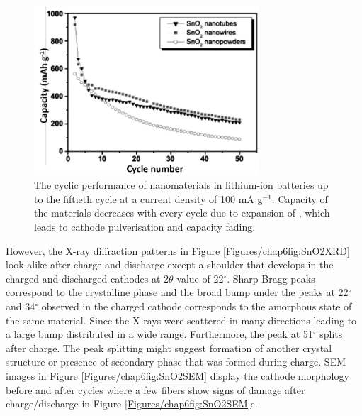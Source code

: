 \begin{figure}[th!]
\centering
\includegraphics[width=0.75\textwidth]{Figures/chap6fig/sno2pap.pdf}
\caption{The cyclic performance of  nanomaterials in lithium-ion batteries up to the fiftieth cycle at a current density of 100 mA g$^{-1}$. Capacity of the materials decreases with every cycle due to expansion of , which leads to cathode pulverisation and capacity fading.}
\label{Figures/chap6fig:sno2pap}
\end{figure}

However, the X-ray diffraction patterns in Figure \ref{Figures/chap6fig:SnO2XRD} look alike after charge and discharge except a shoulder that develops in the charged and discharged cathodes at 2$\theta$ value of 22$^{\circ}$. Sharp Bragg peaks correspond to the crystalline phase and the broad bump under the peaks at 22$^{\circ}$ and  34$^{\circ}$ observed in the charged cathode corresponds to the amorphous state of the same material. Since the X-rays were scattered in many directions leading to a large bump distributed in a wide range. Furthermore, the peak at  51$^{\circ}$ splits after charge. The peak splitting might suggest formation of another crystal structure or presence of secondary phase that was formed during charge. SEM images in Figure \ref{Figures/chap6fig:SnO2SEM} display the cathode morphology before and after cycles where a few fibers show signs of damage after charge/discharge in Figure \ref{Figures/chap6fig:SnO2SEM}c. 

